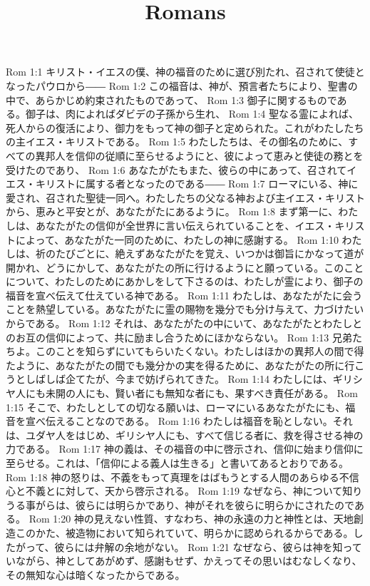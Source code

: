 

\title{Romans}

Rom 1:1  キリスト・イエスの僕、神の福音のために選び別たれ、召されて使徒となったパウロから――
Rom 1:2  この福音は、神が、預言者たちにより、聖書の中で、あらかじめ約束されたものであって、
Rom 1:3  御子に関するものである。御子は、肉によればダビデの子孫から生れ、
Rom 1:4  聖なる霊によれば、死人からの復活により、御力をもって神の御子と定められた。これがわたしたちの主イエス・キリストである。
Rom 1:5  わたしたちは、その御名のために、すべての異邦人を信仰の従順に至らせるようにと、彼によって恵みと使徒の務とを受けたのであり、
Rom 1:6  あなたがたもまた、彼らの中にあって、召されてイエス・キリストに属する者となったのである――
Rom 1:7  ローマにいる、神に愛され、召された聖徒一同へ。わたしたちの父なる神および主イエス・キリストから、恵みと平安とが、あなたがたにあるように。
Rom 1:8  まず第一に、わたしは、あなたがたの信仰が全世界に言い伝えられていることを、イエス・キリストによって、あなたがた一同のために、わたしの神に感謝する。
Rom 1:10  わたしは、祈のたびごとに、絶えずあなたがたを覚え、いつかは御旨にかなって道が開かれ、どうにかして、あなたがたの所に行けるようにと願っている。このことについて、わたしのためにあかしをして下さるのは、わたしが霊により、御子の福音を宣べ伝えて仕えている神である。
Rom 1:11  わたしは、あなたがたに会うことを熱望している。あなたがたに霊の賜物を幾分でも分け与えて、力づけたいからである。
Rom 1:12  それは、あなたがたの中にいて、あなたがたとわたしとのお互の信仰によって、共に励まし合うためにほかならない。
Rom 1:13  兄弟たちよ。このことを知らずにいてもらいたくない。わたしはほかの異邦人の間で得たように、あなたがたの間でも幾分かの実を得るために、あなたがたの所に行こうとしばしば企てたが、今まで妨げられてきた。
Rom 1:14  わたしには、ギリシヤ人にも未開の人にも、賢い者にも無知な者にも、果すべき責任がある。
Rom 1:15  そこで、わたしとしての切なる願いは、ローマにいるあなたがたにも、福音を宣べ伝えることなのである。
Rom 1:16  わたしは福音を恥としない。それは、ユダヤ人をはじめ、ギリシヤ人にも、すべて信じる者に、救を得させる神の力である。
Rom 1:17  神の義は、その福音の中に啓示され、信仰に始まり信仰に至らせる。これは、「信仰による義人は生きる」と書いてあるとおりである。
Rom 1:18  神の怒りは、不義をもって真理をはばもうとする人間のあらゆる不信心と不義とに対して、天から啓示される。
Rom 1:19  なぜなら、神について知りうる事がらは、彼らには明らかであり、神がそれを彼らに明らかにされたのである。
Rom 1:20  神の見えない性質、すなわち、神の永遠の力と神性とは、天地創造このかた、被造物において知られていて、明らかに認められるからである。したがって、彼らには弁解の余地がない。
Rom 1:21  なぜなら、彼らは神を知っていながら、神としてあがめず、感謝もせず、かえってその思いはむなしくなり、その無知な心は暗くなったからである。
